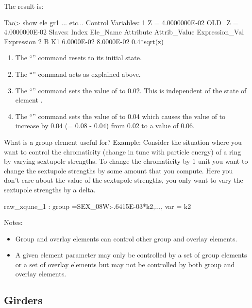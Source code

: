 \documentclass{hitec}
\begin{document}
The result is:

\begin{code}
Tao> show ele gr1
... etc...
Control Variables:
    1   Z  =  4.0000000E-02           OLD_Z  =  4.0000000E-02
Slaves:
   Index   Ele_Name  Attribute   Attrib_Value  Expression_Val    Expression
       2   B         K1            6.0000E-02      8.0000E-02    0.4*sqrt(z)
\end{code}
\vspace{-10 pt}
\begin{enumerate}
\item
The ``'' command resets \tao to its initial state.
\item
The ``'' command acts as explained above.
\item
The ``'' command sets the value of  to 0.02. This is independent of the state of element .
\item
The ``'' command sets the value of  to 0.04 which causes the
value of  to increase by 0.04 (= 0.08 - 0.04) from 0.02 to a value of 0.06.
\end{enumerate}

What is a group element useful for? Example: Consider the situation where you want to control the
chromaticity (change in tune with particle energy) of a ring by varying sextupole strengths. To
change the chromaticity by 1 unit you want to change the sextupole strengths by some amount that you
compute. Here you don't care about the value of the sextupole strengths, you only want to vary the
sextupole strengths by a delta.

\begin{code} 
raw_xqune_1 : group ={SEX_08W:-.6415E-03*k2,...}, var = {k2}
\end{code}

Notes:
\vspace{-10 pt}
\begin{itemize}
\item
Group and overlay elements can control other group and overlay elements.
\item
A given element parameter may only be controlled by a set of group elements or a set of overlay
elements but may not be controlled by both group and overlay elements.
\end{itemize}

\subsection{Girders}
\label{s:girder}
\end{document}
